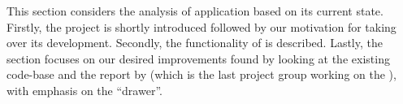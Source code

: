 This section considers the analysis of \launcher application based on its current state.
Firstly, the \launcher project is shortly introduced followed by our motivation for taking over its development.
Secondly, the functionality of \launcher is described.
Lastly, the section focuses on our desired improvements found by looking at the existing code-base and the report by \citet{launcher2012} (which is the last project group working on the \launcher), with emphasis on the ``drawer''.